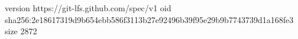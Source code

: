 version https://git-lfs.github.com/spec/v1
oid sha256:2e18617319d9b654ebb586f3113b27e92496b39f95e29b9b7743739d1a168fe3
size 2872
